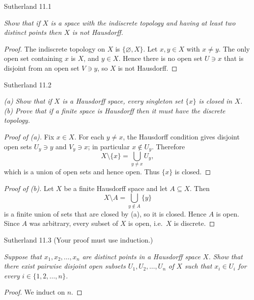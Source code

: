 \documentclass[minion]{homework}
\begin{document}
\begin{problems}

\problem Sutherland 11.1

\textit{Show that if $X$ is a space with the indiscrete topology and having at least two distinct points then $X$ is not Hausdorff.}

\begin{proof}
The indiscrete topology on $X$ is $\{\varnothing, X\}$. Let $x, y \in X$ with $x \neq y$. The only open set containing $x$ is $X$, and $y \in X$. Hence there is no open set $U \ni x$ that is disjoint from an open set $V \ni y$, so $X$ is not Hausdorff.
\end{proof}

\problem Sutherland 11.2

\textit{(a) Show that if $X$ is a Hausdorff space, every singleton set $\{x\}$ is closed in $X$.
(b) Prove that if a finite space is Hausdorff then it must have the discrete topology.}

\begin{proof}[Proof of (a)]
Fix $x \in X$. For each $y \neq x$, the Hausdorff condition gives disjoint open sets $U_y \ni y$ and $V_y \ni x$; in particular $x \notin U_y$. Therefore
\[
X \setminus \{x\} = \bigcup_{y \neq x} U_y,
\]
which is a union of open sets and hence open. Thus $\{x\}$ is closed.
\end{proof}

\begin{proof}[Proof of (b)]
Let $X$ be a finite Hausdorff space and let $A \subseteq X$. Then
\[
X \setminus A = \bigcup_{y \notin A} \{y\}
\]
is a finite union of sets that are closed by (a), so it is closed. Hence $A$ is open. Since $A$ was arbitrary, every subset of $X$ is open, i.e.\ $X$ is discrete.
\end{proof}

\problem Sutherland 11.3 (Your proof must use induction.)

\textit{Suppose that $x_1, x_2, \dots, x_n$ are distinct points in a Hausdorff space $X$. Show that there exist pairwise disjoint open subsets $U_1, U_2, \dots, U_n$ of $X$ such that $x_i \in U_i$ for every $i \in \{1, 2, \dots, n\}$.}

\begin{proof}
We induct on $n$.


\end{proof}
\end{problems}
\end{document}
